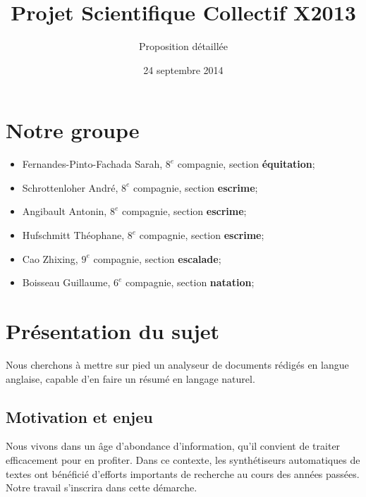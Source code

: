\documentclass{article}           %
\title{Projet Scientifique Collectif X2013}     %
\author{Proposition détaillée}        %
\date{24 septembre 2014}
\begin{document}

\maketitle                        %


\newpage

\tableofcontents			
\newpage

\section*{Notre groupe}

\begin{itemize}
 \item Fernandes-Pinto-Fachada Sarah, \textbf{$8^e$} compagnie, section \textbf{équitation};
 \item Schrottenloher André, \textbf{$8^e$} compagnie, section \textbf{escrime};
 \item Angibault Antonin, \textbf{$8^e$} compagnie, section \textbf{escrime};
 \item Hufschmitt Théophane, \textbf{$8^e$} compagnie, section \textbf{escrime};
 \item Cao Zhixing, \textbf{$9^e$} compagnie, section \textbf{escalade};
 \item Boisseau Guillaume, \textbf{$6^e$} compagnie, section \textbf{natation};
\end{itemize}


\section{Présentation du sujet} %

Nous cherchons à mettre sur pied un analyseur de documents rédigés en langue anglaise, capable d'en faire un résumé en langage naturel.

\subsection{Motivation et enjeu}
Nous vivons dans un \^{a}ge d'abondance d'information, qu'il convient de traiter efficacement pour en profiter. Dans ce contexte, les synthétiseurs automatiques de textes ont bénéficié d'efforts importants de recherche au cours des années passées. Notre travail s'inscrira dans cette démarche.
\end{document}
